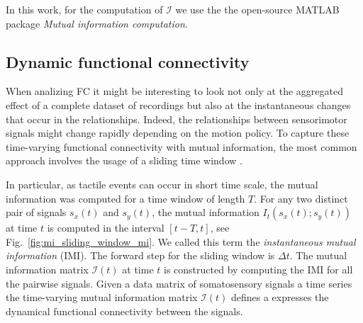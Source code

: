 
In this work, for the computation of $\bm{\mathcal{I}}$ we use the the open-source MATLAB package \emph{Mutual information computation}\cite{PengMutualInformationcomputation}.

\subsection{Dynamic functional connectivity}
When analizing FC it might be interesting to look not only at the aggregated effect of a complete dataset of recordings but also at the instantaneous changes that occur in the relationships. Indeed, the relationships between sensorimotor signals might change rapidly depending on the motion policy. To capture these time-varying functional connectivity with mutual information, the most common approach involves the usage of a sliding time window \cite{Preti2017dynamicfunctionalconnectome}.

In particular, as tactile events can occur in short time scale, the mutual information was computed for a time window of length $T$. For any two distinct pair of signals $s_x(t)$ and $s_y(t)$, the mutual information $I_t(s_x(t);s_y(t))$ at time $t$  is computed in the interval $\left[t-T,t\right]$, see Fig.~\ref{fig:mi_sliding_window_mi}. We called this term the \emph{instantaneous mutual information} (IMI). The forward step for the sliding window is $\Delta t$. The mutual information matrix $\bm{\mathcal{I}}(t)$ at time $t$ is constructed by computing the IMI for all the pairwise signals. Given a data matrix of somatosensory signals a time series the time-varying mutual information matrix $\bm{\mathcal{I}}(t)$ defines a expresses the dynamical functional connectivity between the signals.


